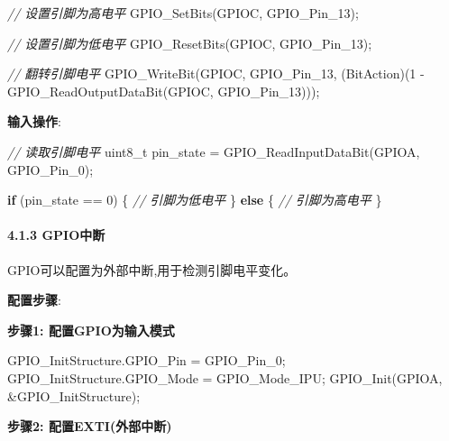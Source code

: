 \documentclass[
]{article}
\newenvironment{Shaded}{}{}
\newcommand{\CommentTok}[1]{\textcolor[rgb]{0.38,0.63,0.69}{\textit{#1}}}
\newcommand{\ControlFlowTok}[1]{\textcolor[rgb]{0.00,0.44,0.13}{\textbf{#1}}}
\newcommand{\DataTypeTok}[1]{\textcolor[rgb]{0.56,0.13,0.00}{#1}}
\newcommand{\DecValTok}[1]{\textcolor[rgb]{0.25,0.63,0.44}{#1}}
\newcommand{\NormalTok}[1]{#1}
\begin{document}
\begin{Shaded}
\begin{Highlighting}[]
\CommentTok{// 设置引脚为高电平}
\NormalTok{GPIO\_SetBits(GPIOC, GPIO\_Pin\_13);}

\CommentTok{// 设置引脚为低电平}
\NormalTok{GPIO\_ResetBits(GPIOC, GPIO\_Pin\_13);}

\CommentTok{// 翻转引脚电平}
\NormalTok{GPIO\_WriteBit(GPIOC, GPIO\_Pin\_13, }
\NormalTok{    (BitAction)(}\DecValTok{1}\NormalTok{ {-} GPIO\_ReadOutputDataBit(GPIOC, GPIO\_Pin\_13)));}
\end{Highlighting}
\end{Shaded}

\textbf{输入操作}:

\begin{Shaded}
\begin{Highlighting}[]
\CommentTok{// 读取引脚电平}
\DataTypeTok{uint8\_t}\NormalTok{ pin\_state = GPIO\_ReadInputDataBit(GPIOA, GPIO\_Pin\_0);}

\ControlFlowTok{if}\NormalTok{ (pin\_state == }\DecValTok{0}\NormalTok{) \{}
    \CommentTok{// 引脚为低电平}
\NormalTok{\} }\ControlFlowTok{else}\NormalTok{ \{}
    \CommentTok{// 引脚为高电平}
\NormalTok{\}}
\end{Highlighting}
\end{Shaded}

\hypertarget{gpioux4e2dux65ad}{%
\paragraph{4.1.3 GPIO中断}\label{gpioux4e2dux65ad}}

GPIO可以配置为外部中断,用于检测引脚电平变化。

\textbf{配置步骤}:

\textbf{步骤1: 配置GPIO为输入模式}

\begin{Shaded}
\begin{Highlighting}[]
\NormalTok{GPIO\_InitStructure.GPIO\_Pin = GPIO\_Pin\_0;}
\NormalTok{GPIO\_InitStructure.GPIO\_Mode = GPIO\_Mode\_IPU;}
\NormalTok{GPIO\_Init(GPIOA, \&GPIO\_InitStructure);}
\end{Highlighting}
\end{Shaded}

\textbf{步骤2: 配置EXTI(外部中断)}
\end{document}
